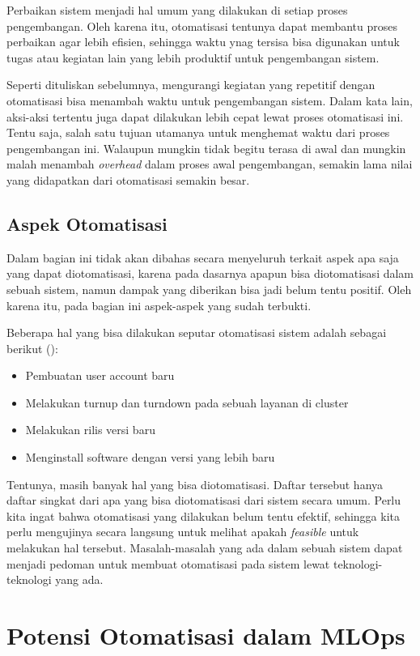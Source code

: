 Perbaikan sistem menjadi hal umum yang dilakukan di setiap proses pengembangan. Oleh karena itu, otomatisasi tentunya dapat membantu proses perbaikan agar lebih efisien, sehingga waktu ynag tersisa bisa digunakan untuk tugas atau kegiatan lain yang lebih produktif untuk pengembangan sistem.

Seperti dituliskan sebelumnya, mengurangi kegiatan yang repetitif dengan otomatisasi bisa menambah waktu untuk pengembangan sistem. Dalam kata lain, aksi-aksi tertentu juga dapat dilakukan lebih cepat lewat proses otomatisasi ini. Tentu saja, salah satu tujuan utamanya untuk menghemat waktu dari proses pengembangan ini. Walaupun mungkin tidak begitu terasa di awal dan mungkin malah menambah \textit{overhead} dalam proses awal pengembangan, semakin lama nilai yang didapatkan dari otomatisasi semakin besar.

\subsection{Aspek Otomatisasi}
Dalam bagian ini tidak akan dibahas secara menyeluruh terkait aspek apa saja yang dapat diotomatisasi, karena pada dasarnya apapun bisa diotomatisasi dalam sebuah sistem, namun dampak yang diberikan bisa jadi belum tentu positif. Oleh karena itu, pada bagian ini aspek-aspek yang sudah terbukti.

Beberapa hal yang bisa dilakukan seputar otomatisasi sistem adalah sebagai berikut (\cite{beyer2016site}):
\begin{itemize}
  \item Pembuatan user account baru
  \item Melakukan turnup dan turndown pada sebuah layanan di cluster
  \item Melakukan rilis versi baru
  \item Menginstall software dengan versi yang lebih baru
\end{itemize}

Tentunya, masih banyak hal yang bisa diotomatisasi. Daftar tersebut hanya daftar singkat dari apa yang bisa diotomatisasi dari sistem secara umum. 
Perlu kita ingat bahwa otomatisasi yang dilakukan belum tentu efektif, sehingga kita perlu mengujinya secara langsung untuk melihat apakah \textit{feasible} untuk melakukan hal tersebut.
Masalah-masalah yang ada dalam sebuah sistem dapat menjadi pedoman untuk membuat otomatisasi pada sistem lewat teknologi-teknologi yang ada.

\section{Potensi Otomatisasi dalam MLOps}

